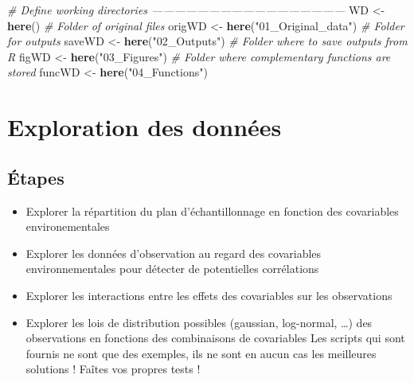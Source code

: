 \documentclass[french,a4paper]{article}
\newenvironment{Shaded}{\begin{snugshade}}{\end{snugshade}}
\newcommand{\KeywordTok}[1]{\textcolor[rgb]{0.13,0.29,0.53}{\textbf{#1}}}
\newcommand{\StringTok}[1]{\textcolor[rgb]{0.31,0.60,0.02}{#1}}
\newcommand{\CommentTok}[1]{\textcolor[rgb]{0.56,0.35,0.01}{\textit{#1}}}
\newcommand{\NormalTok}[1]{#1}
\providecommand{\tightlist}{%
  \setlength{\itemsep}{0pt}\setlength{\parskip}{0pt}}
\begin{document}
\begin{Shaded}
\begin{Highlighting}[]
\CommentTok{# Define working directories ---------------------------------------------------}
\NormalTok{WD <-}\StringTok{ }\KeywordTok{here}\NormalTok{()}
\CommentTok{# Folder of original files}
\NormalTok{origWD <-}\StringTok{ }\KeywordTok{here}\NormalTok{(}\StringTok{"01_Original_data"}\NormalTok{)}
\CommentTok{# Folder for outputs}
\NormalTok{saveWD <-}\StringTok{ }\KeywordTok{here}\NormalTok{(}\StringTok{"02_Outputs"}\NormalTok{)}
\CommentTok{# Folder where to save outputs from R}
\NormalTok{figWD <-}\StringTok{ }\KeywordTok{here}\NormalTok{(}\StringTok{"03_Figures"}\NormalTok{)}
\CommentTok{# Folder where complementary functions are stored}
\NormalTok{funcWD <-}\StringTok{ }\KeywordTok{here}\NormalTok{(}\StringTok{"04_Functions"}\NormalTok{)}
\end{Highlighting}
\end{Shaded}

\section{Exploration des données}\label{exploration-des-donnees-1}

\subsection{Étapes}\label{etapes}


\begin{itemize}
\tightlist
\item
  Explorer la répartition du plan d'échantillonnage en fonction des
  covariables environementales
\item
  Explorer les données d'observation au regard des covariables
  environnementales pour détecter de potentielles corrélations
\item
  Explorer les interactions entre les effets des covariables sur les
  observations
\item
  Explorer les lois de distribution possibles (gaussian, log-normal,
  \ldots{}) des observations en fonctions des combinaisons de
  covariables \nopandoc{\begin{redbox}} Les scripts qui sont fournis ne
  sont que des exemples, ils ne sont en aucun cas les meilleures
  solutions ! Faîtes vos propres tests ! \nopandoc{\end{redbox}}
\end{itemize}
\end{document}
